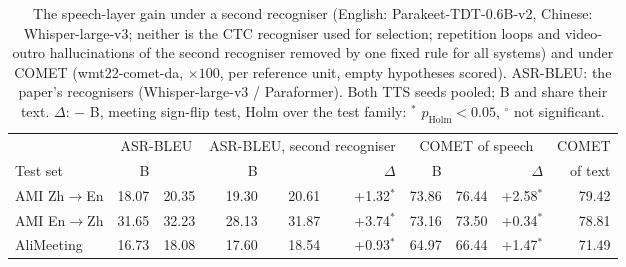 \begin{table}[t]
\centering\small
\setlength{\tabcolsep}{4pt}
\begin{tabular}{lrrrrrrrrr}
\toprule
 & \multicolumn{2}{c}{ASR-BLEU} & \multicolumn{3}{c}{ASR-BLEU, second recogniser} & \multicolumn{3}{c}{COMET of speech} & COMET \\
\cmidrule(lr){2-3}\cmidrule(lr){4-6}\cmidrule(lr){7-9}
Test set & B & \sys{} & B & \sys{} & $\Delta$ & B & \sys{} & $\Delta$ & of text \\
\midrule
AMI Zh$\rightarrow$En & 18.07 & 20.35 & 19.30 & 20.61 & +1.32$^{*}$ & 73.86 & 76.44 & +2.58$^{*}$ & 79.42 \\
AMI En$\rightarrow$Zh & 31.65 & 32.23 & 28.13 & 31.87 & +3.74$^{*}$ & 73.16 & 73.50 & +0.34$^{*}$ & 78.81 \\
AliMeeting & 16.73 & 18.08 & 17.60 & 18.54 & +0.93$^{*}$ & 64.97 & 66.44 & +1.47$^{*}$ & 71.49 \\
\bottomrule
\end{tabular}
\caption{The speech-layer gain under a second recogniser (English: Parakeet-TDT-0.6B-v2, Chinese: Whisper-large-v3; neither is the CTC recogniser used for selection; repetition loops and video-outro hallucinations of the second recogniser removed by one fixed rule for all systems) and under COMET (wmt22-comet-da, $\times100$, per reference unit, empty hypotheses scored). ASR-BLEU: the paper's recognisers (Whisper-large-v3 / Paraformer). Both TTS seeds pooled; B and \sys{} share their text. $\Delta$: \sys{} $-$ B, meeting sign-flip test, Holm over the test family: $^{*}$ $p_\text{Holm}<0.05$, $^{\circ}$ not significant.}
\label{tab:metricsv11}
\end{table}
